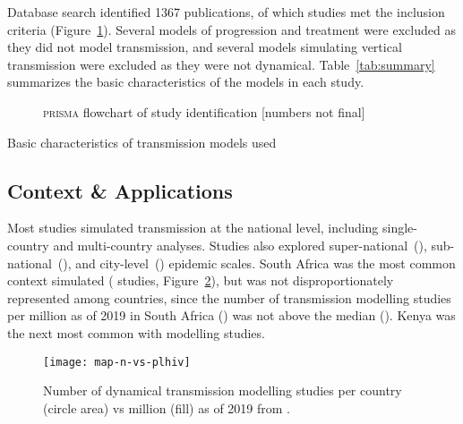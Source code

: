 Database search identified 1367 publications, of which  studies met the inclusion criteria
(Figure~\ref{fig:prisma}).
Several models of \hiv progression and treatment were excluded as they did not model \hiv transmission,
and several models simulating vertical transmission were excluded as they were not dynamical.
Table~\ref{tab:summary} summarizes the basic characteristics of the models in each study.
\begin{figure}[h]
  \centering
  
  \caption{\textsc{prisma} flowchart of study identification [numbers not final]}
  \label{fig:prisma}
\end{figure}
\begin{table}
  \centering
  \caption{Basic characteristics of transmission models used}
  
  \label{tab:summary}
\end{table}
\subsection{Context \& Applications}
\label{ss:res:app}
Most studies simulated \hiv transmission at the national level,
including  single-country and  multi-country analyses.
Studies also explored
super-national~(),
sub-national~(), and
city-level~() epidemic scales.
South Africa was the most common context simulated
( studies, Figure~\ref{fig:map}),
but was not disproportionately represented among \ssa countries, since
the number of transmission modelling studies per million \plhiv as of 2019
in South Africa ()
was not above the \ssa median ().
Kenya was the next most common with  modelling studies.
\begin{figure}[h]
  \centering
  \texttt{[image: map-n-vs-plhiv]}
  \caption{Number of dynamical \hiv transmission modelling studies per country (circle area)
    vs million \plhiv (fill) as of 2019 from \cite{AIDSinfo}.}
  \label{fig:map}
\end{figure}
